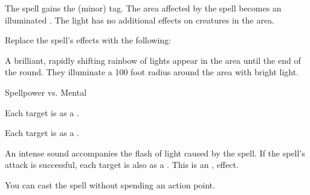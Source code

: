 
The spell gains the  (minor) tag.
The area affected by the spell becomes an illuminated .
The light has no additional effects on creatures in the area.









Replace the spell's effects with the following:
\begin{spellcontent}

\begin{augmenteffects}



\spelleffect
A brilliant, rapidly shifting rainbow of lights appear in the area until the end of the round.
They illuminate a 100 foot radius around the area with bright light.




\begin{spellattack}{Spellpower vs. Mental}


\hit
Each target is \disoriented as a .



\crit
Each target is \confused as a .



\end{spellattack}





\end{augmenteffects}

\end{spellcontent}






An intense sound accompanies the flash of light caused by the spell.
If the spell's attack is successful, each target is also \deafened as a .
This is an ,  effect.






You can cast the spell without spending an action point.




